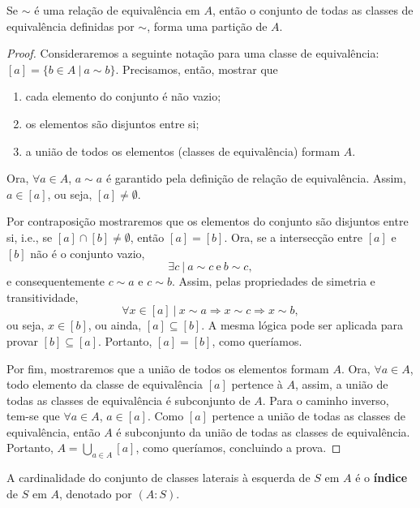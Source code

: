 \documentclass[11pt,openany]{book}
\begin{document}
    \begin{lemma}
    \label{lemma:equivalencia_particao}
        Se $\sim$ é uma relação de equivalência em $A$, então o conjunto de todas as classes de equivalência definidas por $\sim$, forma uma partição de $A$.
    \end{lemma}

    \begin{proof}
        Consideraremos a seguinte notação para uma classe de equivalência: $[a] = \{b \in A \ | \ a\sim b\}$. Precisamos, então, mostrar que 
        \begin{enumerate}[label=\alph*)]
            \item cada elemento do conjunto é não vazio;
            \item os elementos são disjuntos entre si;
            \item a união de todos os elementos (classes de equivalência) formam $A$.
        \end{enumerate}
        Ora, $\forall a \in A$, $a\sim a$ é garantido pela definição de relação de equivalência. Assim, $a \in [a]$, ou seja, $[a] \not= \emptyset$.
    
        Por contraposição mostraremos que os elementos do conjunto são disjuntos entre si, i.e., se $[a] \cap [b] \not= \emptyset$, então $[a] = [b]$. Ora, se a intersecção entre $[a]$ e $[b]$ não é o conjunto vazio,
        \[\exists c \ | \ a\sim c \ \text{e} \ b\sim c,\]
        e consequentemente $c\sim a$ e $c\sim b$. Assim, pelas propriedades de simetria e transitividade,
        \[\forall x \in [a] \ | \ x\sim a \Rightarrow x\sim c \Rightarrow x\sim b,\]
        ou seja, $x \in [b]$, ou ainda, $[a] \subseteq [b]$. A mesma lógica pode ser aplicada para provar $[b] \subseteq [a]$. Portanto, $[a] = [b]$, como queríamos.
    
        Por fim, mostraremos que a união de todos os elementos formam $A$. Ora, $\forall a \in A$, todo elemento da classe de equivalência $[a]$ pertence à $A$, assim, a união de todas as classes de equivalência é subconjunto de $A$. Para o caminho inverso, tem-se que $\forall a \in A$, $a \in [a]$. Como $[a]$ pertence a união de todas as classes de equivalência, então $A$ é subconjunto da união de todas as classes de equivalência. Portanto, $A = \bigcup_{a \in A} [a]$, como queríamos, concluindo a prova.
    \end{proof}

    \begin{definition}
    \label{def:cardinalidade_classe}
        A cardinalidade do conjunto de classes laterais à esquerda de $S$ em $A$ é o \textbf{índice} de $S$ em $A$, denotado por $(A : S)$.
    \end{definition}
\end{document}
